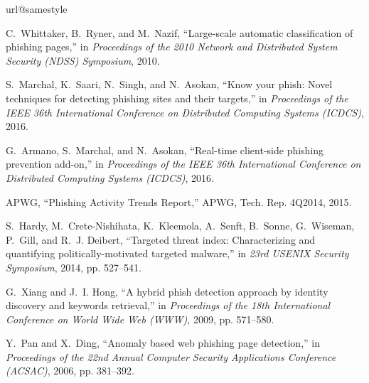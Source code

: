\documentclass[10pt,conference,compsocconf,letterpaper]{IEEEtran}
\begin{document}

\begin{thebibliography}{10}
\providecommand{\url}[1]{#1}
\csname url@samestyle\endcsname
\providecommand{\newblock}{\relax}
\providecommand{\bibinfo}[2]{#2}
\providecommand{\BIBentrySTDinterwordspacing}{\spaceskip=0pt\relax}
\providecommand{\BIBentryALTinterwordstretchfactor}{4}
\providecommand{\BIBentryALTinterwordspacing}{\spaceskip=\fontdimen2\font plus
\BIBentryALTinterwordstretchfactor\fontdimen3\font minus
  \fontdimen4\font\relax}
\providecommand{\BIBforeignlanguage}[2]{{\expandafter\ifx\csname l@#1\endcsname\relax
\typeout{** WARNING: IEEEtran.bst: No hyphenation pattern has been}\typeout{** loaded for the language `#1'. Using the pattern for}\typeout{** the default language instead.}\else
\language=\csname l@#1\endcsname
\fi
#2}}
\providecommand{\BIBdecl}{\relax}
\BIBdecl

C.~Whittaker, B.~Ryner, and M.~Nazif, ``Large-scale automatic classification of
  phishing pages,'' in \emph{Proceedings of the 2010 Network and Distributed
  System Security (NDSS) Symposium}, 2010.

S.~Marchal, K.~Saari, N.~Singh, and N.~Asokan, ``Know your phish: Novel
  techniques for detecting phishing sites and their targets,'' in
  \emph{Proceedings of the IEEE 36th International Conference on Distributed
  Computing Systems (ICDCS)}, 2016.

G.~Armano, S.~Marchal, and N.~Asokan, ``Real-time client-side phishing
  prevention add-on,'' in \emph{Proceedings of the IEEE 36th International
  Conference on Distributed Computing Systems (ICDCS)}, 2016.

APWG, ``{Phishing Activity Trends Report},'' APWG, Tech. Rep. 4Q2014, 2015.

S.~Hardy, M.~Crete-Nishihata, K.~Kleemola, A.~Senft, B.~Sonne, G.~Wiseman,
  P.~Gill, and R.~J. Deibert, ``Targeted threat index: Characterizing and
  quantifying politically-motivated targeted malware,'' in \emph{23rd USENIX
  Security Symposium}, 2014, pp. 527--541.

G.~Xiang and J.~I. Hong, ``A hybrid phish detection approach by identity
  discovery and keywords retrieval,'' in \emph{Proceedings of the 18th
  International Conference on World Wide Web (WWW)}, 2009, pp. 571--580.

Y.~Pan and X.~Ding, ``Anomaly based web phishing page detection,'' in
  \emph{Proceedings of the 22nd Annual Computer Security Applications
  Conference (ACSAC)}, 2006, pp. 381--392.


\end{thebibliography}
\end{document}
